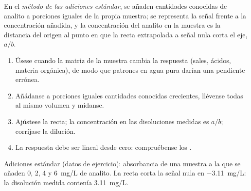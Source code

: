 \begin{definition}\label{def:b2:measurement-statistics:standard-addition}
En el \emph{método de las adiciones estándar}, se añaden cantidades conocidas de analito
a porciones iguales de la propia muestra; se representa la señal frente a la concentración añadida,
y la concentración del analito en la muestra es la distancia del origen al punto en que
la recta extrapolada a señal nula corta el eje, $a/b$.
\end{definition}

\begin{method}\label{met:b2:measurement-statistics:standard-addition}
\begin{enumerate}
  \item Úsese cuando la matriz de la muestra cambia la respuesta (sales, ácidos, materia orgánica), de modo que
        patrones en agua pura darían una pendiente errónea.
  \item Añádanse a porciones iguales cantidades conocidas crecientes, llévense todas al mismo volumen y mídanse.
  \item Ajústese la recta; la concentración en las disoluciones medidas es $a/b$; corríjase la dilución.
  \item La respuesta debe ser lineal desde cero: compruébense los .
\end{enumerate}
\end{method}

\begin{omfigure}

{\small Adiciones estándar (datos de ejercicio): absorbancia de una muestra a la que se añaden 0, 2, 4 y
\qty{6}{mg/L} de analito. La recta corta la señal nula en \qty{-3.11}{mg/L}: la disolución medida
contenía \qty{3.11}{mg/L}.}
\end{omfigure}

